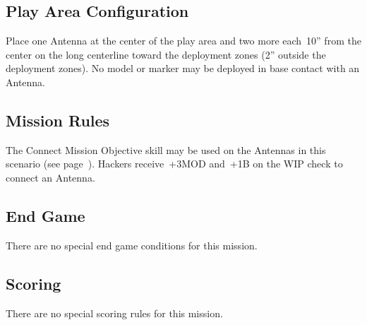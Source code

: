 \label{mission:seizetheantennas}

\subsection{Play Area Configuration}

Place one Antenna at the center of the play area and two more
each~10'' from the center on the long centerline toward the deployment
zones (2'' outside the deployment zones).  No model or marker may be
deployed in base contact with an Antenna.


\subsection{Mission Rules}

The Connect Mission Objective skill may be used on the Antennas in
this scenario (see page~\pageref{sec:hack-objective}).  Hackers
receive~+3MOD and~+1B on the WIP check to connect an Antenna.

\subsection{End Game}

There are no special end game conditions for this mission.

\subsection{Scoring}

There are no special scoring rules for this mission.

